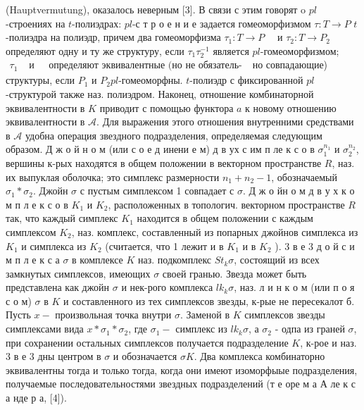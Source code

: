 \documentclass[10pt]{article}
\begin{document}
(Hauptvermutung), оказалось неверным [3]. В связи с этим говорят o $p l$-строениях на $t$-полиэдрах: $p l$-с т р о е н и е задается гомеоморфизмом $\tau: T \rightarrow P$ $t$-полиэдра на полиэдр, причем два гомеоморфизма $\tau_{1}: T \rightarrow P \quad$ и $\tau_{2}: T \rightarrow P_{2}$ определяют одну и ту же структуру, если $\tau_{1} \tau_{2}^{-1}$ является $p l$-гомеоморфизмом; $\begin{array}{llll}\tau_{1} & \text { и } & \text { определяют эквивалентные (но не обязатель- }\end{array}$ но совпадающие) структуры, если $P_{1}$ и $P_{2} p l$-гомеоморфны. $t$-полиэдр с фиксированной $p l$-структурой также наз. полиэдром. Наконец, отношение комбинаторной эквивалентности в $K$ приводит с помощью функтора $a$ к новому отношению эквивалентности в $\mathcal{A}$. Для выражения этого отношения внутренними средствами в $\mathcal{A}$ удобна операция звездного подразделения, определяемая следующим образом. Д ж о й н о м (или с о е д инени е м) д в ух с им п ле к с о в $\sigma_{1}^{n_{1}}$ и $\sigma_{2}^{n_{2}}$, вершины к-рых находятся в общем положении в векторном пространстве $R$, наз. их выпуклая оболочка; это симплекс размерности $n_{1}+n_{2}-1$, обозначаемый $\sigma_{1} * \sigma_{2}$. Джойн $\sigma$ с пустым симплексом 1 совпадает с $\sigma$. Д ж о йн о м д в у х к о м п л е к с о в $K_{1}$ и $K_{2}$, расположенных в топологич. векторном пространстве $R$ так, что каждый симплекс $K_{1}$ находится в общем положении с каждым симплексом $K_{2}$, наз. комплекс, составленный из попарных джойнов симплекса из $K_{1}$ и симплекса из $K_{2}$ (считается, что 1 лежит и в $K_{1}$ и в $K_{2}$ ). 3 в е 3 д о й с и м п л е к с а $\sigma$ в комплексе $K$ наз. подкомплекс $S t_{k} \sigma$, состоящий из всех замкнутых симплексов, имеющих $\sigma$ своей гранью. Звезда может быть представлена как джойн $\sigma$ и нек-рого комплекса $l k_{k} \sigma$, наз. л и н к о м (или п о я с о м) $\sigma$ в $K$ и составленного из тех симплексов звезды, к-рые не пересекалот б. Пусть $x-$ произвольная точка внутри $\sigma$. Заменой в $K$ симплексов звезды симплексами вида $x * \sigma_{1} * \sigma_{2}$, где $\sigma_{1}-$ симплекс из $l k_{k} \sigma$, а $\sigma_{2}$ - одпа из граней $\sigma$, при сохранении остальных симплексов получается подразделение $K$, к-рое и наз. 3 в е 3 дны центром в $\sigma$ и обозначается $\sigma K$. Два комплекса комбинаторно эквивалентны тогда и только тогда, когда они имеют изоморфыые подразделения, получаемые последовательностями звездных подразделений (т е оре м а А ле к с а нде р а, [4]).
\end{document}
